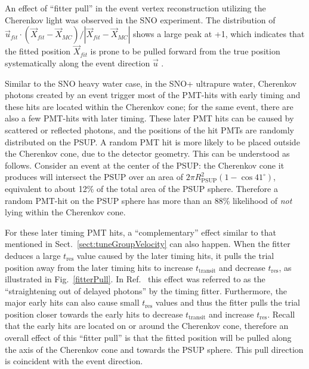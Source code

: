 An effect of ``fitter pull'' in the event vertex reconstruction utilizing the Cherenkov light was observed in the SNO experiment. The distribution of $\vec{u}_{fit}\cdot(\vec{X}_{fit}-\vec{X}_{MC})/|\vec{X}_{fit}-\vec{X}_{MC}|$ shows a large peak at +1, which indicates that the fitted position $\vec{X}_{fit}$ is prone to be pulled forward from the true position systematically along the event direction $\vec{u}$ \cite{coulter2013modelling,driveCorPeter,brice1996monte}. 

Similar to the SNO heavy water case, in the SNO+ ultrapure water, Cherenkov photons created by an event trigger most of the PMT-hits with early timing and these hits are located within the Cherenkov cone; for the same event, there are also a few PMT-hits with later timing. These later PMT hits can be caused by scattered or reflected photons, and the positions of the hit PMTs are randomly distributed on the PSUP. A random PMT hit is more likely to be placed outside the Cherenkov cone, due to the detector geometry. This can be understood as follows. Consider an event at the center of the PSUP: the Cherenkov cone it produces will intersect the PSUP over an area of $2\pi R^2_\mathrm{PSUP}(1-\cos41^\circ)$, equivalent to about 12\% of the total area of the PSUP sphere. Therefore a random PMT-hit on the PSUP sphere has more than an 88\% likelihood of {\em not} lying within the Cherenkov cone. 

For these later timing PMT hits, a ``complementary'' effect similar to that mentioned in Sect.~\ref{sect:tuneGroupVelocity} can also happen. When the fitter deduces a large $t_\mathrm{res}$ value caused by the later timing hits, it pulls the trial position away from the later timing hits to increase $t_\mathrm{transit}$ and decrease $t_\mathrm{res}$, as illustrated in Fig.~\ref{fitterPull}. In Ref.~\cite{driveCorPeter} this effect was referred to as the ``straightening out of delayed photons'' by the timing fitter. Furthermore, the major early hits can also cause small $t_\mathrm{res}$ values and thus the fitter pulls the trial position closer towards the early hits to decrease $t_\mathrm{transit}$ and increase $t_\mathrm{res}$. Recall that the early hits are located on or around the Cherenkov cone, therefore an overall effect of this ``fitter pull'' is that the fitted position will be pulled along the axis of the Cherenkov cone and towards the PSUP sphere. This pull direction is coincident with the event direction.

